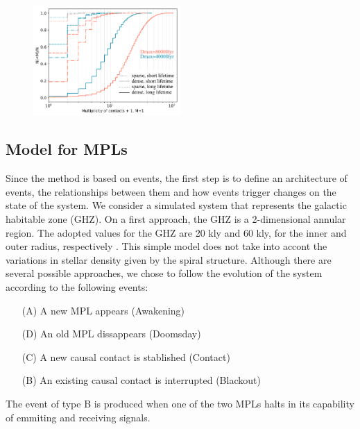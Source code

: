 
                 
\begin{figure} \centering
   \includegraphics[width=0.5\textwidth]{F1.pdf}
    \label{F_number_of_contacts}
\end{figure}
   

\subsection{Model for MPLs}


Since the method is based on events, the first step is to define an
architecture of events, the relationships between them and how events
trigger changes on the state of the system.
%
We consider a simulated system that represents the galactic habitable
zone (GHZ).
%
On a first approach, the GHZ is a 2-dimensional annular region.
%
The adopted values for the GHZ are 20 kly and 60 kly, for the inner
and outer radius, respectively \citep{lineweaver_galactic_2004}.
%
This simple model does not take into accont the variations in stellar
density given by the spiral structure.
%
Although there are several possible approaches, we chose to follow the
evolution of the system according to the following events:

\begin{enumerate}
   \item[(A)] A new MPL appears (Awakening)
   \item[(D)] An old MPL dissappears (Doomsday)
   \item[(C)] A new causal contact is stablished (Contact)
   \item[(B)] An existing causal contact is interrupted (Blackout)
\end{enumerate}

The event of type B is produced when one of the two MPLs halts in its
capability of emmiting and receiving signals.

